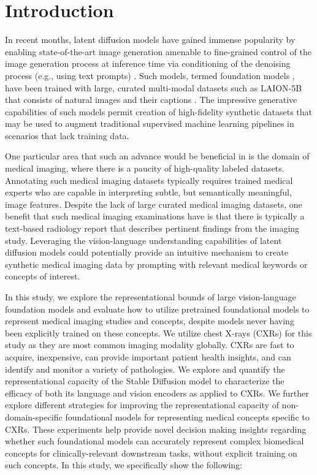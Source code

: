 \documentclass{article}
\begin{document}
\section{Introduction}

In recent months, latent diffusion models have gained immense popularity by enabling state-of-the-art image generation amenable to fine-grained control of the image generation process at inference time via conditioning of the denoising process (e.g., using text prompts) \citep{ramesh2022, Rombach2022, imagen2022}. Such models, termed foundation models \citep{foundationmodels2021}, have been trained with large, curated multi-modal datasets such as LAION-5B that consists of natural images and their captions \citep{schuhmann2022laionb}. The impressive generative capabilities of such models permit creation of high-fidelity synthetic datasets that may be used to augment traditional supervised machine learning pipelines in scenarios that lack training data. 

One particular area that such an advance would be beneficial in is the domain of medical imaging, where there is a paucity of high-quality labeled datasets. Annotating such medical imaging datasets typically requires trained medical experts who are capable in interpreting subtle, but semantically meaningful, image features. Despite the lack of large curated medical imaging datasets, one benefit that such medical imaging examinations have is that there is typically a text-based radiology report that describes pertinent findings from the imaging study. Leveraging the vision-language understanding capabilities of latent diffusion models could potentially provide an intuitive mechanism to create synthetic medical imaging data by prompting with relevant medical keywords or concepts of interest.

In this study, we explore the representational bounds of large vision-language foundation models and evaluate how to utilize pretrained foundational models to represent medical imaging studies and concepts, despite models never having been explicitly trained on these concepts. We utilize chest X-rays (CXRs) for this study as they are most common imaging modality globally. CXRs are fast to acquire, inexpensive, can provide important patient health insights, and can identify and monitor a variety of pathologies. We explore and quantify the representational capacity of the Stable Diffusion model \citep{Rombach2022} to characterize the efficacy of both its language and vision encoders as applied to CXRs. We further explore different strategies for improving the representational capacity of non-domain-specific foundational models for representing medical concepts specific to CXRs. These experiments help provide novel decision making insights regarding whether such foundational models can accurately represent complex biomedical concepts for clinically-relevant downstream tasks, without explicit training on such concepts. In this study, we specifically show the following:
\end{document}
